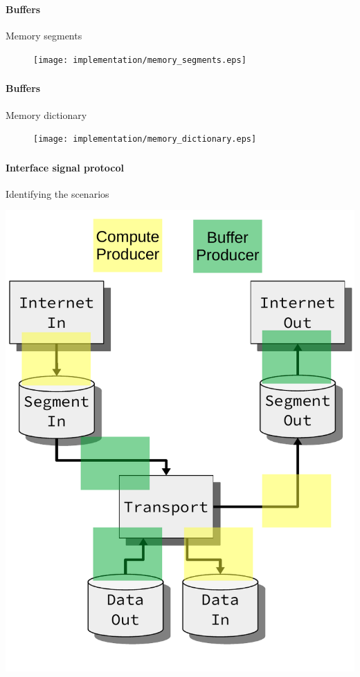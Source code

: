 \begin{frame}[fragile]
    \frametitle{\ImplementationTitle}
    \framesubtitle{Buffers}
    Memory segments\\
    \begin{minipage}[t]{1\textwidth}
        \begin{figure}
                \centering
                \texttt{[image: implementation/memory\_segments.eps]}
        \end{figure}
    \end{minipage}
\end{frame}

\begin{frame}[fragile]
    \frametitle{\ImplementationTitle}
    \framesubtitle{Buffers}
    Memory dictionary\\
    \begin{minipage}[t]{1\textwidth}
        \begin{figure}
                \centering
                \texttt{[image: implementation/memory\_dictionary.eps]}
        \end{figure}
    \end{minipage}
\end{frame}


\begin{frame}[fragile]
    \frametitle{\ImplementationTitle}
    \framesubtitle{Interface signal protocol}
Identifying the scenarios

\centering
\includegraphics[scale=0.40]{implementation/signal_protocol_identification.pdf}

\end{frame}




